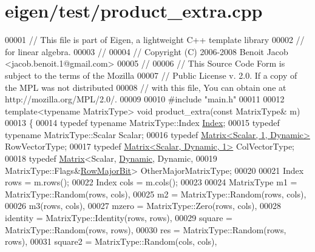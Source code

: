 \hypertarget{eigen_2test_2product__extra_8cpp_source}{}\section{eigen/test/product\+\_\+extra.cpp}
\label{eigen_2test_2product__extra_8cpp_source}

\begin{DoxyCode}
00001 \textcolor{comment}{// This file is part of Eigen, a lightweight C++ template library}
00002 \textcolor{comment}{// for linear algebra.}
00003 \textcolor{comment}{//}
00004 \textcolor{comment}{// Copyright (C) 2006-2008 Benoit Jacob <jacob.benoit.1@gmail.com>}
00005 \textcolor{comment}{//}
00006 \textcolor{comment}{// This Source Code Form is subject to the terms of the Mozilla}
00007 \textcolor{comment}{// Public License v. 2.0. If a copy of the MPL was not distributed}
00008 \textcolor{comment}{// with this file, You can obtain one at http://mozilla.org/MPL/2.0/.}
00009 
00010 \textcolor{preprocessor}{#include "main.h"}
00011 
00012 \textcolor{keyword}{template}<\textcolor{keyword}{typename} MatrixType> \textcolor{keywordtype}{void} product\_extra(\textcolor{keyword}{const} MatrixType& m)
00013 \{
00014   \textcolor{keyword}{typedef} \textcolor{keyword}{typename} MatrixType::Index \hyperlink{namespace_eigen_a62e77e0933482dafde8fe197d9a2cfde}{Index};
00015   \textcolor{keyword}{typedef} \textcolor{keyword}{typename} MatrixType::Scalar Scalar;
00016   \textcolor{keyword}{typedef} \hyperlink{group___core___module_class_eigen_1_1_matrix}{Matrix<Scalar, 1, Dynamic>} RowVectorType;
00017   \textcolor{keyword}{typedef} \hyperlink{group___core___module}{Matrix<Scalar, Dynamic, 1>} ColVectorType;
00018   \textcolor{keyword}{typedef} \hyperlink{group___core___module_class_eigen_1_1_matrix}{Matrix}<Scalar, \hyperlink{namespace_eigen_ad81fa7195215a0ce30017dfac309f0b2}{Dynamic}, Dynamic,
00019                          MatrixType::Flags&\hyperlink{group__flags_gae4f56c2a60bbe4bd2e44c5b19cbe8762}{RowMajorBit}> OtherMajorMatrixType;
00020 
00021   Index rows = m.rows();
00022   Index cols = m.cols();
00023 
00024   MatrixType m1 = MatrixType::Random(rows, cols),
00025              m2 = MatrixType::Random(rows, cols),
00026              m3(rows, cols),
00027              mzero = MatrixType::Zero(rows, cols),
00028              identity = MatrixType::Identity(rows, rows),
00029              square = MatrixType::Random(rows, rows),
00030              res = MatrixType::Random(rows, rows),
00031              square2 = MatrixType::Random(cols, cols),

\end{DoxyCode}
